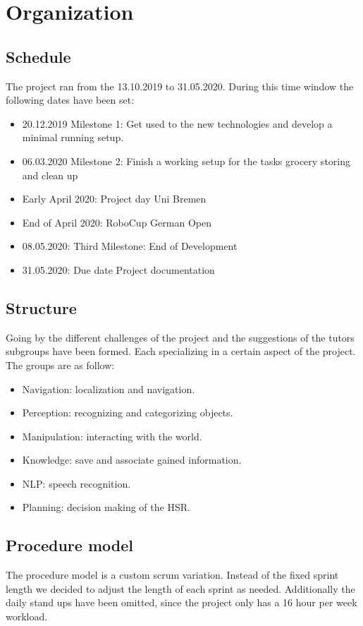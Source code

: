 \documentclass[main.tex]{subfiles}
\begin{document}
	\chapter{Organization}
	
	\section{Schedule}
	The project ran from the 13.10.2019 to 31.05.2020. During this time window the following dates have been set:
	\begin{itemize}
		\item 20.12.2019 Milestone 1: Get used to the new technologies and develop a minimal running setup.
		\item 06.03.2020 Milestone 2: Finish a working setup for the tasks grocery storing and clean up
		\item Early April 2020: Project day Uni Bremen
		\item End of April 2020: RoboCup German Open
		\item 08.05.2020: Third Milestone: End of Development
		\item 31.05.2020: Due date Project documentation
	\end{itemize}

	\section{Structure}
	Going by the different challenges of the project and the suggestions of the tutors subgroups have been formed. Each specializing in a certain aspect of the project. 
	The groups are as follow:
	\begin{itemize}
		\item Navigation: localization and navigation.
		\item Perception: recognizing and categorizing objects.
		\item Manipulation: interacting with the world.
		\item Knowledge: save and associate gained information.
		\item NLP: speech recognition.
		\item Planning: decision making of the HSR.
	\end{itemize}   

	\section{Procedure model}
	The procedure model is a custom scrum variation. Instead of the fixed sprint length we decided to adjust the length of each sprint as needed. Additionally the daily stand ups have been omitted, since the project only has a 16 hour per week workload.
	
\end{document}
